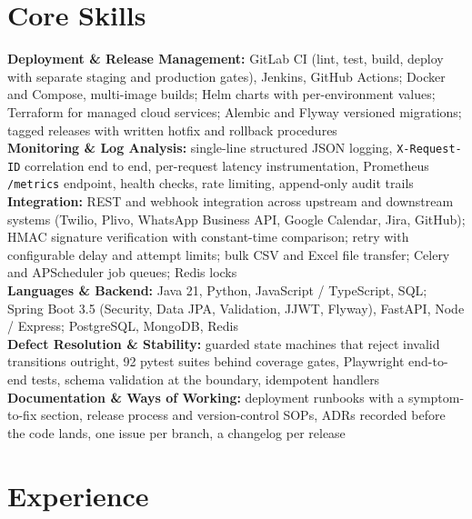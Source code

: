 \documentclass[10pt,a4paper]{article}
\begin{document}
\section{Core Skills}
\textbf{Deployment \& Release Management:} GitLab CI (lint, test, build, deploy with separate staging
and production gates), Jenkins, GitHub Actions; Docker and Compose, multi-image builds; Helm charts
with per-environment values; Terraform for managed cloud services; Alembic and Flyway versioned
migrations; tagged releases with written hotfix and rollback procedures\\
\textbf{Monitoring \& Log Analysis:} single-line structured JSON logging, \texttt{X-Request-ID}
correlation end to end, per-request latency instrumentation, Prometheus \texttt{/metrics} endpoint,
health checks, rate limiting, append-only audit trails\\
\textbf{Integration:} REST and webhook integration across upstream and downstream systems (Twilio,
Plivo, WhatsApp Business API, Google Calendar, Jira, GitHub); HMAC signature verification with
constant-time comparison; retry with configurable delay and attempt limits; bulk CSV and Excel file
transfer; Celery and APScheduler job queues; Redis locks\\
\textbf{Languages \& Backend:} Java 21, Python, JavaScript / TypeScript, SQL; Spring Boot 3.5
(Security, Data JPA, Validation, JJWT, Flyway), FastAPI, Node / Express; PostgreSQL, MongoDB, Redis\\
\textbf{Defect Resolution \& Stability:} guarded state machines that reject invalid transitions
outright, 92 pytest suites behind coverage gates, Playwright end-to-end tests, schema validation at
the boundary, idempotent handlers\\
\textbf{Documentation \& Ways of Working:} deployment runbooks with a symptom-to-fix section, release
process and version-control SOPs, ADRs recorded before the code lands, one issue per branch, a
changelog per release

\section{Experience}
\end{document}
